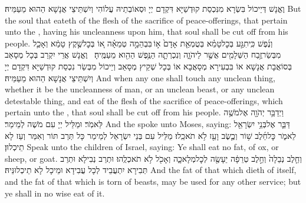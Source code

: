 {וֶאֱנָשׁ דְּיֵיכוֹל בִּשְׂרָא מִנִּכְסַת קוּדְשַׁיָּא דִּקְדָם יְיָ וּסְאוֹבְתֵיהּ עֲלוֹהִי וְיִשְׁתֵּיצֵי אֲנָשָׁא הַהוּא מֵעַמֵּיהּ׃}
{But the soul that eateth of the flesh of the sacrifice of peace-offerings, that pertain unto the \lord, having his uncleanness upon him, that soul shall be cut off from his people.}{}
{וְנֶ֜פֶשׁ כִּֽי\maqqaf תִגַּ֣ע בְּכׇל\maqqaf טָמֵ֗א בְּטֻמְאַ֤ת אָדָם֙ א֣וֹ \legarmeh  בִּבְהֵמָ֣ה טְמֵאָ֗ה א֚וֹ בְּכׇל\maqqaf שֶׁ֣קֶץ טָמֵ֔א וְאָכַ֛ל מִבְּשַׂר\maqqaf זֶ֥בַח הַשְּׁלָמִ֖ים אֲשֶׁ֣ר לַיהֹוָ֑ה וְנִכְרְתָ֛ה הַנֶּ֥פֶשׁ הַהִ֖וא מֵעַמֶּֽיהָ׃ \petucha {}}
{וֶאֱנָשׁ אֲרֵי יִקְרַב בְּכָל מְסָאַב בְּסוֹאֲבָת אֲנָשָׁא אוֹ בִּבְעִירָא מְסָאֲבָא אוֹ בְּכָל שְׁקֵיץ מְסָאַב וְיֵיכוֹל מִבְּשַׂר נִכְסַת קוּדְשַׁיָּא דִּקְדָם יְיָ וְיִשְׁתֵּיצֵי אֲנָשָׁא הַהוּא מֵעַמֵּיהּ׃}
{And when any one shall touch any unclean thing, whether it be the uncleanness of man, or an unclean beast, or any unclean detestable thing, and eat of the flesh of the sacrifice of peace-offerings, which pertain unto the \lord, that soul shall be cut off from his people.}{}
{וַיְדַבֵּ֥ר יְהֹוָ֖ה אֶל\maqqaf מֹשֶׁ֥ה לֵּאמֹֽר׃}
{וּמַלֵּיל יְיָ עִם מֹשֶׁה לְמֵימַר׃}
{And the \lord\space spoke unto Moses, saying:}{}
{דַּבֵּ֛ר אֶל\maqqaf בְּנֵ֥י יִשְׂרָאֵ֖ל לֵאמֹ֑ר כׇּל\maqqaf חֵ֜לֶב שׁ֥וֹר וְכֶ֛שֶׂב וָעֵ֖ז לֹ֥א תֹאכֵֽלוּ׃}
{מַלֵּיל עִם בְּנֵי יִשְׂרָאֵל לְמֵימַר כָּל תְּרַב תּוֹר וְאִמַּר וְעֵז לָא תֵיכְלוּן׃}
{Speak unto the children of Israel, saying: Ye shall eat no fat, of ox, or sheep, or goat.}{}
{וְחֵ֤לֶב נְבֵלָה֙ וְחֵ֣לֶב טְרֵפָ֔ה יֵעָשֶׂ֖ה לְכׇל\maqqaf מְלָאכָ֑ה וְאָכֹ֖ל לֹ֥א תֹאכְלֻֽהוּ׃}
{וּתְרַב נְבִילָא וּתְרַב תְּבִירָא יִתְעֲבֵיד לְכָל עֲבִידָא וּמֵיכָל לָא תֵיכְלוּנֵּיהּ׃}
{And the fat of that which dieth of itself, and the fat of that which is torn of beasts, may be used for any other service; but ye shall in no wise eat of it.}{}
